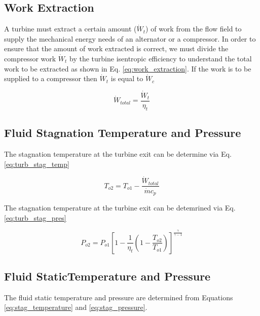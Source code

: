 \subsection{Work Extraction}
A turbine must extract a certain amount ($\dot{W}_t$) of work from the flow field to supply the mechanical energy needs of an alternator
or a compressor.  In order to ensure that the amount of work extracted is correct, we must divide the compressor work $\dot{W}_t$ by 
the turbine isentropic efficiency to understand the total work to be extracted as shown in Eq. \ref{eq:work_extraction}.  If the work 
is to be supplied to a compressor then $\dot{W}_t$ is equal to $\dot{W}_c$

\begin{equation}
\label{eq:work_extraction}
\dot{W}_{total} = \frac{\dot{W}_t}{\eta_t}
\end{equation}


\subsection{Fluid Stagnation Temperature and Pressure}
The stagnation temperature at the turbine exit can be determine via Eq. \ref{eq:turb_stag_temp}

\begin{equation}
\label{eq:turb_stag_temp}
T_{o2} = T_{o1} - \frac{\dot{W}_{total}}{\dot{m}c_p}
\end{equation}

The stagnation temperature at the turbine exit can be detemrined via Eq. \ref{eq:turb_stag_pres}

\begin{equation}
\label{eq:turb_stag_pres}
P_{o2} = P_{o1}\left[1 - \frac{1}{\eta_t}\left(1 - \frac{T_{o2}}{T_{o1}} \right) \right]^{\frac{\gamma}{\gamma - 1}}
\end{equation}

\subsection{Fluid StaticTemperature and Pressure}
The fluid static temperature and pressure are determined from Equations  \ref{eq:stag_temperature} and \ref{eq:stag_pressure}.

